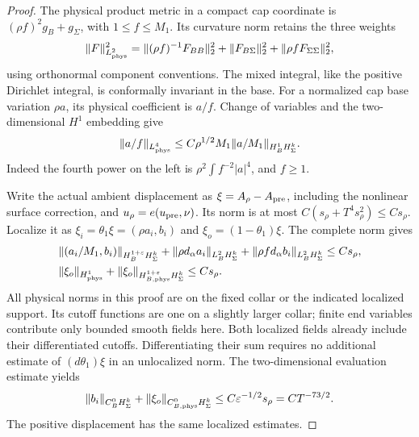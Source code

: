 \documentclass[11pt]{amsart}
\theoremstyle{definition}
\theoremstyle{remark}
\theoremstyle{plain}
\begin{document}
\begin{proof}
The physical product metric in a compact cap coordinate is
$(\rho f)^2g_B+g_\Sigma$, with $1\leq f\leq M_1$. Its curvature norm
retains the three weights
\begin{equation}\label{eq:constructed-curvature-weights}
 \|F\|_{L^2_{\rm phys}}^2
  =\| (\rho f)^{-1}F_{BB}\|_2^2
       +\|F_{B\Sigma}\|_2^2+\|\rho fF_{\Sigma\Sigma}\|_2^2,
\end{equation}
using orthonormal component conventions. The mixed integral, like the
positive Dirichlet integral, is conformally invariant in the base. For a
normalized cap base variation $\rho a$, its physical coefficient is
$a/f$. Change of variables and the two-dimensional $H^1$ embedding give
\begin{equation}\label{eq:constructed-base-lfour}
 \|a/f\|_{L^4_{\rm phys}}
       \leq C\rho^{1/2}M_1\|a/M_1\|_{H^1_BH^k_\Sigma}.
\end{equation}
Indeed the fourth power on the left is
$\rho^2\int f^{-2}|a|^4$, and $f\geq1$.

Write the actual ambient displacement as $\xi=A_\rho-A_{\rm pre}$,
including the nonlinear surface correction, and
$u_\rho=e(u_{\rm pre},\nu)$. Its norm is at most
$C(s_\rho+T^4s_\rho^2)\leq Cs_\rho$. Localize it as
$\xi_i=\theta_1\xi=(\rho a_i,b_i)$ and
$\xi_o=(1-\theta_1)\xi$. The complete norm gives
\begin{equation}\label{eq:constructed-localized-displacement}
 \begin{split}
 &\|(a_i/M_1,b_i)\|_{H^{1+\varepsilon}_BH^k_\Sigma}
   +\|\rho d_\alpha a_i\|_{L^2_BH^k_\Sigma}
   +\|\rho f d_\alpha b_i\|_{L^2_BH^k_\Sigma}
                                           \leq Cs_\rho,\\
 &\|\xi_o\|_{H^1_{\rm phys}}
       +\|\xi_o\|_{H^{1+\varepsilon}_{B,\rm phys}H^k_\Sigma}
                                           \leq Cs_\rho.
 \end{split}
\end{equation}
All physical norms in this proof are on the fixed collar or the indicated
localized support. Its cutoff functions are one on a slightly larger
collar; finite end variables contribute only bounded smooth fields here.
Both localized fields already include their differentiated cutoffs.
Differentiating their sum requires no additional estimate of
$(d\theta_1)\xi$ in an unlocalized norm. The two-dimensional evaluation
estimate yields
\begin{equation}\label{eq:constructed-pointwise-displacement}
 \|b_i\|_{C^0_BH^k_\Sigma}
    +\|\xi_o\|_{C^0_{B,\rm phys}H^k_\Sigma}
       \leq C\varepsilon^{-1/2}s_\rho=CT^{-73/2}.
\end{equation}
The positive displacement has the same localized estimates.


\end{proof}
\end{document}
